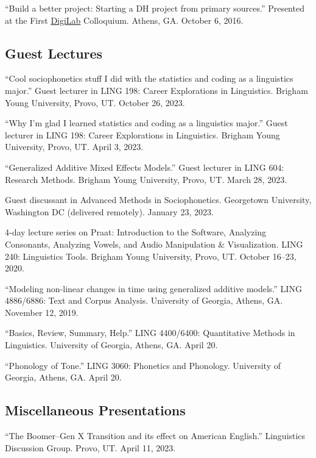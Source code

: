 \documentclass[
]{article}
\begin{document}
``Build a better project: Starting a DH project from primary sources.''
Presented at the First \href{http://digi.uga.edu/digilab/}{DigiLab}
Colloquium. Athens, GA. October 6, 2016.

\hypertarget{guest-lectures}{%
\subsection{Guest Lectures}\label{guest-lectures}}

``Cool sociophonetics stuff I did with the statistics and coding as a
linguistics major.'' Guest lecturer in LING 198: Career Explorations in
Linguistics. Brigham Young University, Provo, UT. October 26, 2023.

``Why I'm glad I learned statistics and coding as a linguistics major.''
Guest lecturer in LING 198: Career Explorations in Linguistics. Brigham
Young University, Provo, UT. April 3, 2023.

``Generalized Additive Mixed Effects Models.'' Guest lecturer in LING
604: Research Methods. Brigham Young University, Provo, UT. March 28,
2023.

Guest discussant in Advanced Methods in Sociophonetics. Georgetown
University, Washington DC (delivered remotely). January 23, 2023.

4-day lecture series on Praat: Introduction to the Software, Analyzing
Consonants, Analyzing Vowels, and Audio Manipulation \& Visualization.
LING 240: Linguistics Tools. Brigham Young University, Provo, UT.
October 16--23, 2020.

``Modeling non-linear changes in time using generalized additive
models.'' LING 4886/6886: Text and Corpus Analysis. University of
Georgia, Athens, GA. November 12, 2019.

``Basics, Review, Summary, Help.'' LING 4400/6400: Quantitative Methods
in Linguistics. University of Georgia, Athens, GA. April 20.

``Phonology of Tone.'' LING 3060: Phonetics and Phonology. University of
Georgia, Athens, GA. April 20.

\hypertarget{miscellaneous-presentations}{%
\subsection{Miscellaneous
Presentations}\label{miscellaneous-presentations}}

``The Boomer--Gen X Transition and its effect on American English.''
Linguistics Discussion Group. Provo, UT. April 11, 2023.
\end{document}
